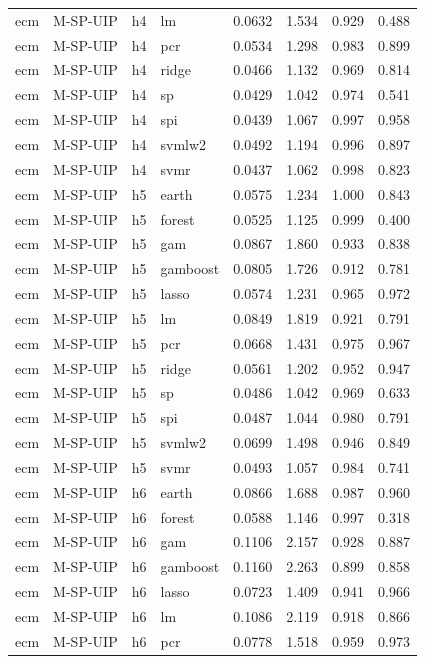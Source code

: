 \begin{ThreePartTable}
\begin{longtable}[t]{llclcccc}
ecm & M-SP-UIP & h4 & lm & 0.0632 & 1.534 & 0.929 & 0.488\\
ecm & M-SP-UIP & h4 & pcr & 0.0534 & 1.298 & 0.983 & 0.899\\
ecm & M-SP-UIP & h4 & ridge & 0.0466 & 1.132 & 0.969 & 0.814\\
ecm & M-SP-UIP & h4 & sp & 0.0429 & 1.042 & 0.974 & 0.541\\
ecm & M-SP-UIP & h4 & spi & 0.0439 & 1.067 & 0.997 & 0.958\\
ecm & M-SP-UIP & h4 & svmlw2 & 0.0492 & 1.194 & 0.996 & 0.897\\
ecm & M-SP-UIP & h4 & svmr & 0.0437 & 1.062 & 0.998 & 0.823\\
\addlinespace
ecm & M-SP-UIP & h5 & earth & 0.0575 & 1.234 & 1.000 & 0.843\\
ecm & M-SP-UIP & h5 & forest & 0.0525 & 1.125 & 0.999 & 0.400\\
ecm & M-SP-UIP & h5 & gam & 0.0867 & 1.860 & 0.933 & 0.838\\
ecm & M-SP-UIP & h5 & gamboost & 0.0805 & 1.726 & 0.912 & 0.781\\
ecm & M-SP-UIP & h5 & lasso & 0.0574 & 1.231 & 0.965 & 0.972\\
ecm & M-SP-UIP & h5 & lm & 0.0849 & 1.819 & 0.921 & 0.791\\
ecm & M-SP-UIP & h5 & pcr & 0.0668 & 1.431 & 0.975 & 0.967\\
ecm & M-SP-UIP & h5 & ridge & 0.0561 & 1.202 & 0.952 & 0.947\\
ecm & M-SP-UIP & h5 & sp & 0.0486 & 1.042 & 0.969 & 0.633\\
ecm & M-SP-UIP & h5 & spi & 0.0487 & 1.044 & 0.980 & 0.791\\
ecm & M-SP-UIP & h5 & svmlw2 & 0.0699 & 1.498 & 0.946 & 0.849\\
ecm & M-SP-UIP & h5 & svmr & 0.0493 & 1.057 & 0.984 & 0.741\\
\addlinespace
ecm & M-SP-UIP & h6 & earth & 0.0866 & 1.688 & 0.987 & 0.960\\
ecm & M-SP-UIP & h6 & forest & 0.0588 & 1.146 & 0.997 & 0.318\\
ecm & M-SP-UIP & h6 & gam & 0.1106 & 2.157 & 0.928 & 0.887\\
ecm & M-SP-UIP & h6 & gamboost & 0.1160 & 2.263 & 0.899 & 0.858\\
ecm & M-SP-UIP & h6 & lasso & 0.0723 & 1.409 & 0.941 & 0.966\\
ecm & M-SP-UIP & h6 & lm & 0.1086 & 2.119 & 0.918 & 0.866\\
ecm & M-SP-UIP & h6 & pcr & 0.0778 & 1.518 & 0.959 & 0.973\\

\end{longtable}
\end{ThreePartTable}
